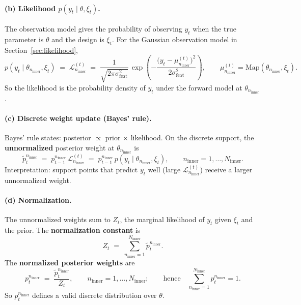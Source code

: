 \documentclass[10pt]{article}
\newcommand{\Map}{\mathrm{Map}}
\newcommand{\Ninner}{N_{\mathrm{inner}}}
\newcommand{\ninner}{n_{\mathrm{inner}}}
\begin{document}
\paragraph{(b) Likelihood $p(y_t\mid\theta,\xi_t)$.}
The observation model gives the probability of observing $y_t$ when the true parameter is $\theta$ and the design is $\xi_t$. For the Gaussian observation model in Section~\ref{sec:likelihood},
\begin{equation}
p(y_t\mid\theta_{\ninner},\xi_t)\;=\;\mathcal{L}_{\ninner}^{(t)}\;=\;\frac{1}{\sqrt{2\pi\sigma_{\mathrm{feat}}^2}}\,\exp\left(-\frac{\big(y_t-\mu_{\ninner}^{(t)}\big)^2}{2\sigma_{\mathrm{feat}}^2}\right),\qquad \mu_{\ninner}^{(t)}=\Map(\theta_{\ninner},\xi_t).
\end{equation}
So the likelihood is the probability density of $y_t$ under the forward model at $\theta_{\ninner}$.

\paragraph{(c) Discrete weight update (Bayes' rule).}
Bayes' rule states: posterior $\propto$ prior $\times$ likelihood. On the discrete support, the \textbf{unnormalized} posterior weight at $\theta_{\ninner}$ is
\begin{equation}
\tilde p_t^{\ninner}\;=\;p_{t-1}^{\ninner}\,\mathcal{L}_{\ninner}^{(t)}\;=\;p_{t-1}^{\ninner}\,p(y_t\mid\theta_{\ninner},\xi_t),\qquad \ninner=1,\dots,\Ninner.
\end{equation}
Interpretation: support points that predict $y_t$ well (large $\mathcal{L}_{\ninner}^{(t)}$) receive a larger unnormalized weight.

\paragraph{(d) Normalization.}
The unnormalized weights sum to $Z_t$, the marginal likelihood of $y_t$ given $\xi_t$ and the prior. The \textbf{normalization constant} is
\begin{equation}
Z_t\;=\;\sum_{\ninner=1}^{\Ninner}\tilde p_t^{\ninner}.
\end{equation}
The \textbf{normalized posterior weights} are
\begin{equation}
p_t^{\ninner}\;=\;\frac{\tilde p_t^{\ninner}}{Z_t},\qquad \ninner=1,\dots,\Ninner;\qquad\text{hence}\quad \sum_{\ninner=1}^{\Ninner}p_t^{\ninner}=1.
\end{equation}
So $p_t^{\ninner}$ defines a valid discrete distribution over $\theta$.
\end{document}
